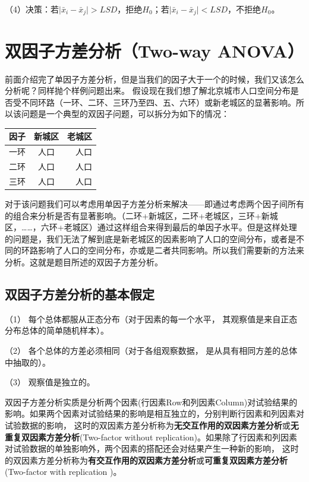 \documentclass[]{ctexbook}
\begin{document}
（4）决策：若\(\vert {\bar x_i-\bar x_j} \vert > LSD\)，拒绝\(H_0\)；若\(\vert {\bar x_i-\bar x_j} \vert < LSD\)，不拒绝\(H_0\)。

\hypertarget{ux53ccux56e0ux5b50ux65b9ux5deeux5206ux6790two-way-anova}{%
\section{双因子方差分析（Two-way ANOVA）}\label{ux53ccux56e0ux5b50ux65b9ux5deeux5206ux6790two-way-anova}}

前面介绍完了单因子方差分析，但是当我们的因子大于一个的时候，我们又该怎么分析呢？同样抛个样例问题出来。
假设现在我们想了解北京城市人口空间分布是否受不同环路（一环、二环、三环乃至四、五、六环）或新老城区的显著影响。所以该问题是一个典型的双因子问题，可以拆分为如下的情况：

\begin{longtable}[]{@{}lcr@{}}
\toprule
因子 & 新城区 & 老城区\tabularnewline
\midrule
\endhead
一环 & 人口 & 人口\tabularnewline
二环 & 人口 & 人口\tabularnewline
三环 & 人口 & 人口\tabularnewline
\bottomrule
\end{longtable}

对于该问题我们可以考虑用单因子方差分析来解决------即通过考虑两个因子间所有的组合来分析是否有显著影响。（二环+新城区，二环+老城区，三环+新城区，\ldots\ldots，六环+老城区）通过这样组合来得到最后的单因子水平。但是这样处理的问题是，我们无法了解到底是新老城区的因素影响了人口的空间分布，或者是不同的环路影响了人口的空间分布，亦或是二者共同影响。所以我们需要新的方法来分析。这就是题目所述的双因子方差分析。

\hypertarget{ux53ccux56e0ux5b50ux65b9ux5deeux5206ux6790ux7684ux57faux672cux5047ux5b9a}{%
\subsection{双因子方差分析的基本假定}\label{ux53ccux56e0ux5b50ux65b9ux5deeux5206ux6790ux7684ux57faux672cux5047ux5b9a}}

（1） 每个总体都服从正态分布（对于因素的每一个水平， 其观察值是来自正态分布总体的简单随机样本）。

（2） 各个总体的方差必须相同（对于各组观察数据， 是从具有相同方差的总体中抽取的）。

（3） 观察值是独立的。

双因子方差分析实质是分析两个因素(行因素Row和列因素Column)对试验结果的影响。如果两个因素对试验结果的影响是相互独立的，分别判断行因素和列因素对试验数据的影响， 这时的双因素方差分析称为\textbf{无交互作用的双因素方差分析}或\textbf{无重复双因素方差分析}(Two-factor without replication)。如果除了行因素和列因素对试验数据的单独影响外，两个因素的搭配还会对结果产生一种新的影响， 这时的双因素方差分析称为\textbf{有交互作用的双因素方差分析}或\textbf{可重复双因素方差分析} (Two-factor with replication )。
\end{document}

